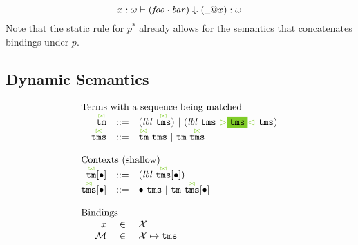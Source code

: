 \documentclass{article}
\makeatletter
\newcommand{\cursorColor}{LimeGreen}
\newcommand{\lbl}{\ensuremath{\mathit{lbl}}}
\newcommand{\lbls}{\ensuremath{\mathit{lbls}}}
\newcommand{\tm}{\ensuremath{\mathtt{tm}}}
\newcommand{\tms}{\ensuremath{\mathtt{tms}}}
\newcommand{\Tmc}{\ensuremath{\overset{ \textcolor{\cursorColor}{\bowtie}}{\tm}}}
\newcommand{\Tmcs}{\ensuremath{\overset{\textcolor{\cursorColor}{\bowtie}}{\tms}}}
\newcommand{\mstart}{\ensuremath{\textcolor{\cursorColor}{\rhd}}}
\newcommand{\mend}{\ensuremath{\textcolor{\cursorColor}{\lhd}}}
\newcommand{\bindings}{\ensuremath{\mathcal{M}}}
\newcommand{\select}[1]{\mstart\colorbox{\cursorColor}{$#1$}\mend}
\newcommand{\wfp}[3]{\ensuremath{#1 \vdash #2 : #3}}
\newcommand{\pseq}[2]{\ensuremath{#1 \cdot #2}}
\newcommand{\children}[2]{\ensuremath{#1} \Downarrow #2}
\newcommand{\pnot}[1]{\ensuremath{\lnot #1}}
\newcommand{\many}[1]{\ensuremath{#1^*}}
\newcommand{\any}{\ensuremath{\text{\underline{\hspace{0.6em}}}}}
\newcommand{\bind}[2]{\ensuremath{#1@#2}}
\newcommand{\fb}[1]{\ensuremath{\mathop{\rightarrow}(#1)}}
\newcommand{\pin}[1]{\ensuremath{\mathit{In}(#1)}}
\newcommand{\pstart}{\ensuremath{\mathit{Start}}}
\newcommand{\pend}{\ensuremath{\mathit{End}}}
\newcommand{\arrayheading}[2]{\multicolumn{#1}{l}{\mbox{#2}}}
\makeatother
\begin{document}
\[
  \wfp{x : \omega}{\children{(\pseq{\mathit{foo}}{\mathit{bar}})}{(\bind{\any}{x})}}{\omega}
\]
%
Note that the static rule for \many{p} already allows for the
semantics that concatenates bindings under $p$.

\subsection{Dynamic Semantics}
\label{sec:match:dyn}

\[
  \begin{array}{rcl}
    \arrayheading{3}{Terms with a sequence being matched}\\
    \Tmc & ::= & (\lbl~\Tmcs) ~|~ (\lbl~\tms~\select{\tms}~\tms)\\
    \Tmcs & ::= & \Tmc ~ \tms ~|~ \tm ~ \Tmcs\\
    \\
    \arrayheading{3}{Contexts (shallow)}\\
    \Tmc[\bullet] & ::= & (\lbl~\Tmcs[\bullet])\\
    \Tmcs[\bullet] & ::= & \bullet ~ \tms ~|~ \tm ~ \Tmcs[\bullet]\\
    \\
    \arrayheading{3}{Bindings}\\
    x         & \in & \mathcal{X}\\
    \bindings & \in & \mathcal{X} \mapsto \tms\\

\end{array}\]
\end{document}
